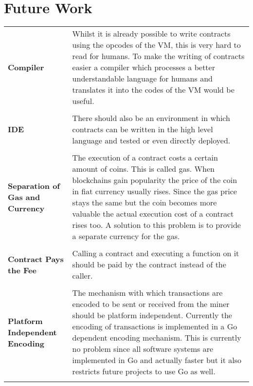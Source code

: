 \section{Future Work}
\begin{tabular}[t]{ p{3cm} p{12.5cm}}
\raggedright
\textbf{Compiler} & 
Whilst it is already possible to write contracts using the opcodes of the VM, this is very hard to read for humans. To make the writing of contracts easier a compiler which processes a better understandable language for humans and translates it into the codes of the VM would be useful. \\ \\

\raggedright
\textbf{IDE} & 
There should also be an environment in which contracts can be written in the high level language and tested or even directly deployed. \\ \\

\raggedright
\textbf{Separation of Gas and Currency} & 
The execution of a contract costs a certain amount of coins. This is called gas. When blockchains gain popularity the price of the coin in fiat currency usually rises. Since the gas price stays the same but the coin becomes more valuable the actual execution cost of a contract rises too. A solution to this problem is to provide a separate currency for the gas. \\ \\

\raggedright
\textbf{Contract Pays the Fee} & 
Calling a contract and executing a function on it should be paid by the contract instead of the caller. \\ \\

\raggedright
\textbf{Platform Independent Encoding} &
The mechanism with which transactions are encoded to be sent or received from the miner should be platform independent. Currently the encoding of transactions is implemented in a Go dependent encoding mechanism. This is currently no problem since all software systems are implemented in Go and actually faster but it also restricts future projects to use Go as well. \\ \\ 
\end{tabular}